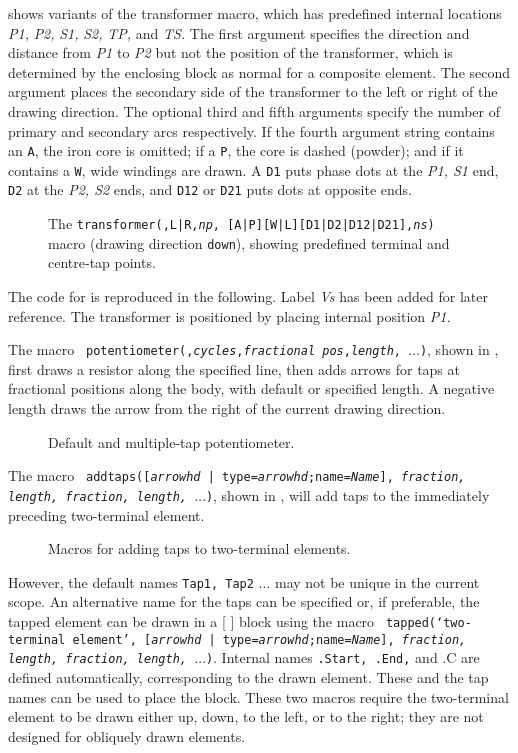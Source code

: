  shows variants of the transformer macro,
which has predefined internal locations
{\sl P1,} {\sl P2,} {\sl S1,} {\sl S2,} {\sl TP,} and {\sl TS.}
The first argument specifies the direction and distance from {\sl P1}
to {\sl P2} but not the position of the transformer, which is determined
by the enclosing block as normal for a composite element.  The second
argument places the secondary side of the transformer to the left or
right of the drawing direction.  The optional third and fifth arguments
specify the number of primary and secondary arcs respectively.  If the
fourth argument string contains an {\tt A}, the iron core is omitted;
if a {\tt P}, the core is dashed (powder); and if it contains a {\tt W},
wide windings are drawn.  A {\tt D1} puts phase dots at the {\sl P1,
S1} end, {\tt D2} at the {\sl P2, S2} ends, and {\tt D12} or {\tt D21}
puts dots at opposite ends.
\begin{figure}[H]
   
  \caption{The {\tt transformer(\linespec,L|R,{\sl np},%
[A|P][W|L][D1|D2|D12|D21],{\sl ns})}
     macro (drawing direction {\tt down}), showing predefined terminal
     and centre-tap points.}
   \label{Xform}
   \end{figure}

The code for  is reproduced in the following.
Label {\sl Vs} has been added for later reference.
The transformer is positioned by placing internal position {\sl P1.}


The macro {\tt
   potentiometer(\linespec,{\sl cycles},{\sl fractional pos},{\sl length},
    $\ldots$)},
shown in ,
first draws a resistor along the specified line, then adds arrows for taps
at fractional positions along the body, with default or specified length.
A negative length draws the arrow from the right of the current drawing
direction.
\begin{figure}[H]
   
   \caption{Default and multiple-tap potentiometer.}
   \label{Potentiometers}
   \end{figure}

\pagebreak
The macro {\tt
    addtaps([{\sl arrowhd} | type={\sl arrowhd};name={\sl Name}],
    {\sl fraction, length, fraction, length,}
    $\ldots$)},
shown in , will add taps to the
immediately preceding two-terminal element.
\begin{figure}[H]
   
   \caption{Macros for adding taps to two-terminal elements.}
   \label{Taps}
   \end{figure}
However, the default names
{\tt Tap1, Tap2} $\ldots$ may not be unique in the current scope.  An
alternative name for the taps can be specified or, if preferable, the
tapped element can be drawn in a [ ] block using the macro {\tt
  tapped(`{\sl two-terminal element}',
  [{\sl arrowhd} | type={\sl arrowhd};name={\sl Name}],
    {\sl fraction, length, fraction, length,} $\ldots$)}.
   Internal names {\tt .Start, .End,} and {.C} are defined automatically,
   corresponding to the drawn element. These and the tap names can be used
   to place the block.
These two macros require the two-terminal element to be drawn either up,
down, to the left, or to the right; they are not designed for obliquely
drawn elements.

